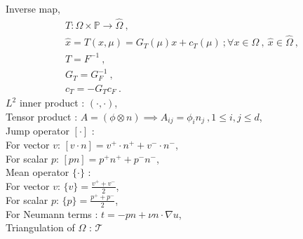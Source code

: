 \documentclass[a4paper,oneside,openright,spanish,english]{book}
\begin{document}
\begin{appendices}
Inverse map,
\begin{gather*} 
T : \Omega \times \mathbb{P} \rightarrow \hat{\Omega} \ , \\
\hat{x} = T(x,\mu) = G_T(\mu)x + c_T(\mu) \ ; \forall x \in \Omega \ , \ \hat{x} \in \hat{\Omega} \ , \\
T = F^{-1} \ ,\\
G_T = G_F^{-1} \ , \\
c_T = -G_T c_F \ .
\end{gather*}
$L^2$ inner product : $(\cdot,\cdot)$, \\
Tensor product : $A = (\phi \otimes n) \implies A_{ij} = \phi_i n_j \ , 1\leq i,j \leq d$, \\
Jump operator $[\cdot]$ : \\
For vector $v$: $[v \cdot n] = v^+ \cdot n^+ + v^- \cdot n^-$, \\
For scalar $p$: $[pn] = p^+ n^+ + p^- n^-$, \\
Mean operator $\lbrace \cdot \rbrace$ : \\
For vector $v$: $\lbrace v \rbrace = \frac{v^+ + v^-}{2}$, \\
For scalar $p$: $\lbrace p \rbrace = \frac{p^+ + p^-}{2}$, \\
For Neumann terms : $t = -pn + \nu n \cdot \nabla u$, \\
Triangulation of $\Omega$ : $\mathcal{T}$

\end{appendices}



\end{document}
